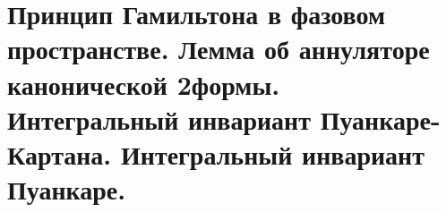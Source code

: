 \section{Принцип Гамильтона в фазовом пространстве. Лемма об аннуляторе канонической 2формы. Интегральный инвариант Пуанкаре-Картана. Интегральный инвариант Пуанкаре.}\label{chasec19}



\newpage